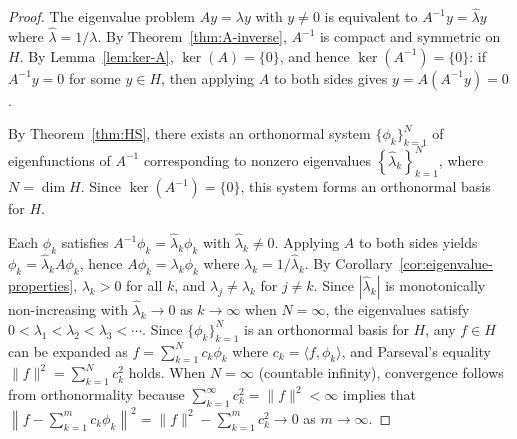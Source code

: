 \documentclass{article}
\numberwithin{equation}{section}
\numberwithin{theorem}{section}
\newcommand{\shalmalirmk}[1]{\textcolor{red}{\textsf{[Shalmali: #1]}}}
\begin{document}
\begin{proof}
The eigenvalue problem $Ay = \lambda y$ with $y \neq 0$ is equivalent to $A^{-1}y = \widehat{\lambda} y$ where $\widehat{\lambda} = 1/\lambda$. By Theorem~\ref{thm:A-inverse}, $A^{-1}$ is compact and symmetric on $H$. By Lemma~\ref{lem:ker-A}, $\ker(A) = \{0\}$, and hence $\ker(A^{-1}) = \{0\}$: if $A^{-1}y = 0$ for some $y \in H$, then applying $A$ to both sides gives $y = A(A^{-1}y) = 0$.

By Theorem~\ref{thm:HS}, there exists an orthonormal system $\{\phi_k\}_{k=1}^N$ of eigenfunctions of $A^{-1}$ corresponding to nonzero eigenvalues $\left\{\widehat{\lambda}_k\right\}_{k=1}^N$, where $N = \dim H$. Since $\ker(A^{-1}) = \{0\}$, this system forms an orthonormal basis for $H$.

Each $\phi_k$ satisfies $A^{-1}\phi_k = \widehat{\lambda}_k \phi_k$ with $\widehat{\lambda}_k \neq 0$. Applying $A$ to both sides yields $\phi_k = \widehat{\lambda}_k A\phi_k$, hence $A\phi_k = \lambda_k \phi_k$ where $\lambda_k = 1/\widehat{\lambda}_k$. By Corollary~\ref{cor:eigenvalue-properties}, $\lambda_k > 0$ for all $k$, and $\lambda_j \neq \lambda_k$ for $j \neq k$. Since $|\widehat{\lambda}_k|$ is monotonically non-increasing with $\widehat{\lambda}_k \to 0$ as $k \to \infty$ when $N = \infty$, the eigenvalues satisfy $0 < \lambda_1 < \lambda_2 < \lambda_3 < \cdots$. Since $\{\phi_k\}_{k=1}^N$ is an orthonormal basis for $H$, any $f \in H$ can be expanded as $f = \displaystyle\sum_{k=1}^N c_k \phi_k$ where $c_k = \langle f, \phi_k \rangle$, and Parseval's equality $\|f\|^2 = \displaystyle\sum_{k=1}^N c_k^2$ holds. When $N = \infty$ (countable infinity), convergence follows from orthonormality because $\displaystyle\sum_{k=1}^\infty c_k^2 = \|f\|^2 < \infty$ implies that
$\left\| f - \displaystyle\sum_{k=1}^m c_k \phi_k \right\|^2 = \|f\|^2 - \displaystyle\sum_{k=1}^m c_k^2 \to 0$
as $m \to \infty$.
\end{proof}

\end{document}
